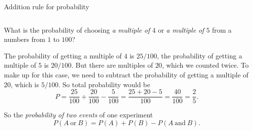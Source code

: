 \documentclass[9pt,aspectratio=169]{beamer}
\begin{document}
\begin{frame}{Addition rule for probability}
\begin{columns}[T]
\begin{column}{0.5\textwidth}
      \begin{problem}
        What is the probability of choosing \emph{a multiple of $4$} or \emph{a multiple of $5$} from a numbers from $1$ to $100$?
      \end{problem}
      The probability of getting a multiple of $4$ is $25/100$, the probability of getting a multiple of $5$ is $20/100$. But there are multiples of $20$, which we counted twice. To make up for this case, we need to subtract the probability of getting a multiple of $20$, which is $5/100$. So total probability would be
      \[
        P = \frac{25}{100} + \frac{20}{100} - \frac{5}{100} = \frac{25 + 20 - 5}{100} = \frac{40}{100} = \frac{2}{5}.
      \]
      \begin{definition}
        So the \emph{probability of two events} of one experiment
        \[ P(A\ \text{or}\ B) = P(A) + P(B) - P(A\ \text{and}\ B). \]
        \vspace*{-2.5ex}          
      \end{definition}
    \end{column}
  \end{columns}
\end{frame}
\end{document}
